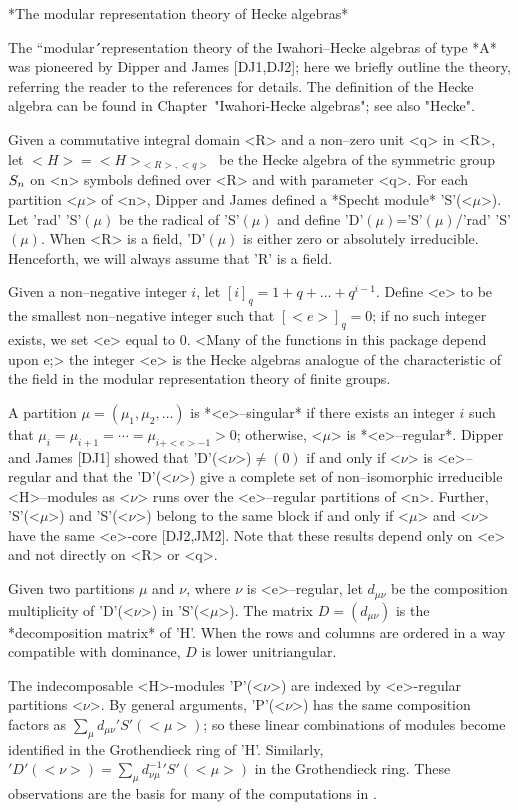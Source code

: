 *The modular representation theory of Hecke algebras*

The ``modular\'\'\ representation theory of the Iwahori--Hecke algebras of
type *A* was pioneered by Dipper and James [DJ1,DJ2]; here we briefly 
outline the theory, referring the reader to the references for details. 
The definition of the Hecke algebra can be found in Chapter~"Iwahori-Hecke
algebras"; see also "Hecke".

Given a commutative integral domain <R> and a non--zero unit <q> in <R>,
let $<H>=<H>_{<R>, <q>}$ be the Hecke algebra of the symmetric group 
$S_n$ on <n> symbols defined over <R> and with parameter <q>. For 
each partition <$\mu$> of <n>, Dipper and James defined a *Specht 
module* 'S'(<$\mu$>). Let 'rad' 'S'$(\mu)$ be the radical of 'S'$(\mu)$ 
and define 'D'$(\mu)$='S'$(\mu)$/'rad' 'S'$(\mu)$. When <R> is a field, 
'D'$(\mu)$ is either zero or absolutely irreducible. Henceforth, we will 
always assume that 'R' is a field.

Given a non--negative integer $i$, let $[i]_q=1+q+\ldots+q^{i-1}$. Define
<e> to be the smallest non--negative  integer such that $[<e>]_q=0$; if 
no such integer exists, we set <e> equal to $0$. <Many of the functions 
in this package depend upon e;> the integer <e> is the Hecke algebras 
analogue of the characteristic of the field in the modular representation 
theory of finite groups.

A partition $\mu=(\mu_1,\mu_2,\ldots)$ is *<e>--singular* if there exists 
an integer $i$ such that $\mu_i=\mu_{i+1}=\cdots=\mu_{i+<e>-1}>0$;
otherwise, <$\mu$> is *<e>--regular*. Dipper and James [DJ1] showed that 
'D'(<$\nu$>)$\ne(0)$ if and only if <$\nu$> is <e>--regular and that the 
'D'(<$\nu$>) give a complete set of non--isomorphic irreducible 
<H>--modules as <$\nu$> runs over the <e>--regular partitions of <n>. 
Further, 'S'(<$\mu$>) and 'S'(<$\nu$>) belong to the same block if and 
only if <$\mu$> and <$\nu$> have the same <e>-core [DJ2,JM2]. Note that 
these results depend only on <e> and not directly on <R> or <q>.

Given two partitions $\mu$ and $\nu$, where $\nu$ is <e>--regular, let 
$d_{\mu\nu}$ be the composition multiplicity of 'D'(<$\nu$>) in 
'S'(<$\mu$>).  The matrix $D=(d_{\mu\nu})$ is the *decomposition matrix* 
of 'H'. When the rows and columns are ordered in a way compatible with 
dominance, $D$ is lower unitriangular. 

The indecomposable <H>-modules 'P'(<$\nu$>) are indexed by <e>-regular 
partitions <$\nu$>. By general arguments, 'P'(<$\nu$>) has the same 
composition factors as 
             $  \sum_{\mu} d_{\mu\nu} 'S'(<\mu>)  $; 
so these linear combinations of modules become identified in the 
Grothendieck ring of 'H'. Similarly, 
          $ 'D'(<\nu>) = \sum_{\mu} d_{\nu\mu}^{-1} 'S'(<\mu>) $ 
in the Grothendieck ring. These observations are the basis for many of 
the computations in \Specht.

